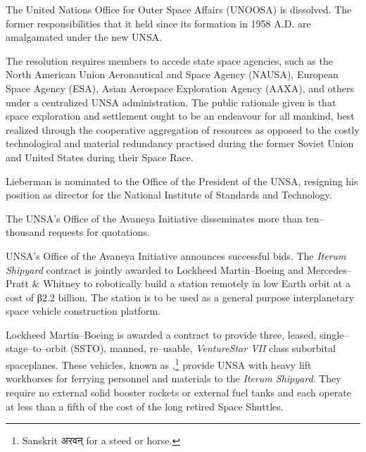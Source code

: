 The United Nations Office for Outer Space Affairs (UNOOSA) is dissolved. The former responsibilities that it held since its formation in 1958 A.D. are amalgamated under the new UNSA.

The resolution requires members to accede state space agencies, such as the North American Union Aeronautical and Space Agency (NAUSA), European Space Agency (ESA), Asian Aerospace Exploration Agency (AAXA), and others under a centralized UNSA administration. The public rationale given is that space exploration and settlement ought to be an endeavour for all mankind, best realized through the cooperative aggregation of resources as opposed to the costly technological and material redundancy practised during the former Soviet Union and United States during their Space Race.

Lieberman is nominated to the Office of the President of the UNSA, resigning his position as director for the National Institute of Standards and Technology.
\StopTimelineDate

The UNSA's Office of the Avaneya Initiative disseminates more than ten--thousand requests for quotations.
\StopTimelineDate

UNSA's Office of the Avaneya Initiative announces successful bids. The {\it Iterum Shipyard} contract is jointly awarded to Lockheed Martin--Boeing and Mercedes--Pratt & Whitney to robotically build a station remotely in low Earth orbit at a cost of β2.2 billion. The station is to be used as a general purpose interplanetary space vehicle construction platform.


Lockheed Martin--Boeing is awarded a contract to provide three, leased, single--stage--to--orbit (SSTO), manned, re--usable, {\it VentureStar VII} class suborbital spaceplanes. These vehicles, known as ,\footnote{Sanskrit अरवन् for a steed or horse.} provide UNSA with heavy lift workhorses for ferrying personnel and materials to the {\it Iterum Shipyard}. They require no external solid booster rockets or external fuel tanks and each operate at less than a fifth of the cost of the long retired Space Shuttles.

